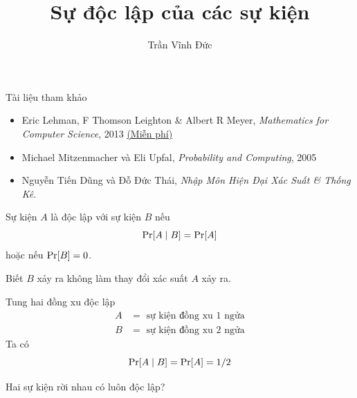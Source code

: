 
\title{Sự độc lập của các sự kiện} 
 \author{Trần Vĩnh Đức}
 
\maketitle

\begin{frame}{Tài liệu tham khảo}  
  \begin{itemize}
  \item Eric Lehman, F Thomson Leighton \& Albert R Meyer,
    \textit{Mathematics for Computer Science}, 2013
    \href{https://www.seas.harvard.edu/courses/cs20/MIT6_042Notes.pdf}{\color{blue}(Miễn
    phí)}
  \item Michael Mitzenmacher và Eli Upfal, \textit{Probability and Computing}, 2005
  \item  Nguyễn Tiến Dũng và Đỗ Đức Thái, \textit{Nhập Môn Hiện Đại Xác Suất \& Thống Kê}.
  \end{itemize}
\end{frame} 

\begin{frame}
	\begin{dfntn}
		Sự kiện $A$ là độc lập với sự kiện $B$ nếu
		\[
			\mathrm{Pr}[A\mid B] = \mathrm{Pr}[A]
		\]
		hoặc nếu $\mathrm{Pr}[B] = 0$.
	\end{dfntn}
	Biết $B$ xảy ra không làm thay đổi xác suất  $A$ xảy ra.
\end{frame}

\begin{frame}
	\begin{xmpl}
		Tung hai đồng xu độc lập 
		\begin{align*}
			A &= \text{ sự kiện đồng xu $1$ ngửa}\\
			B &= \text{ sự kiện đồng xu $2$ ngửa}
		\end{align*}
	Ta có
	\[
		\mathrm{Pr}[A\mid B] = \mathrm{Pr}[A] = 1/2
	\]
	\end{xmpl}
	
\end{frame}

\begin{frame}
	\begin{qstn}
		Hai sự kiện rời nhau có luôn độc lập?
	\end{qstn}
	
\end{frame}

